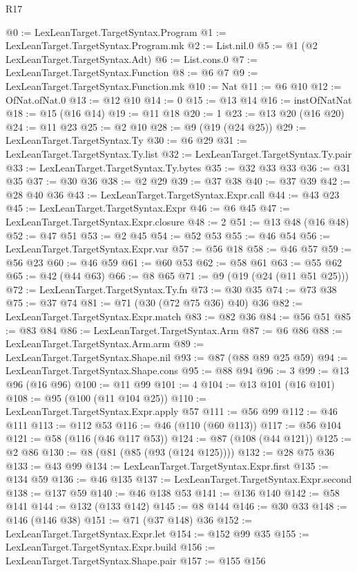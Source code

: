 \begin{lexlean}{R17}
\begin{coremodule}
@0 := LexLeanTarget.TargetSyntax.Program
@1 := LexLeanTarget.TargetSyntax.Program.mk
@2 := List.nil.{0}
@5 := @1 (@2 LexLeanTarget.TargetSyntax.Adt)
@6 := List.cons.{0}
@7 := LexLeanTarget.TargetSyntax.Function
@8 := @6 @7
@9 := LexLeanTarget.TargetSyntax.Function.mk
@10 := Nat
@11 := @6 @10
@12 := OfNat.ofNat.{0}
@13 := @12 @10
@14 := 0
@15 := @13 @14
@16 := instOfNatNat
@18 := @15 (@16 @14)
@19 := @11 @18
@20 := 1
@23 := @13 @20 (@16 @20)
@24 := @11 @23
@25 := @2 @10
@28 := @9 (@19 (@24 @25))
@29 := LexLeanTarget.TargetSyntax.Ty
@30 := @6 @29
@31 := LexLeanTarget.TargetSyntax.Ty.list
@32 := LexLeanTarget.TargetSyntax.Ty.pair
@33 := LexLeanTarget.TargetSyntax.Ty.bytes
@35 := @32 @33 @33
@36 := @31 @35
@37 := @30 @36
@38 := @2 @29
@39 := @37 @38
@40 := @37 @39
@42 := @28 @40 @36
@43 := LexLeanTarget.TargetSyntax.Expr.call
@44 := @43 @23
@45 := LexLeanTarget.TargetSyntax.Expr
@46 := @6 @45
@47 := LexLeanTarget.TargetSyntax.Expr.closure
@48 := 2
@51 := @13 @48 (@16 @48)
@52 := @47 @51
@53 := @2 @45
@54 := @52 @53
@55 := @46 @54
@56 := LexLeanTarget.TargetSyntax.Expr.var
@57 := @56 @18
@58 := @46 @57
@59 := @56 @23
@60 := @46 @59
@61 := @60 @53
@62 := @58 @61
@63 := @55 @62
@65 := @42 (@44 @63)
@66 := @8 @65
@71 := @9 (@19 (@24 (@11 @51 @25)))
@72 := LexLeanTarget.TargetSyntax.Ty.fn
@73 := @30 @35
@74 := @73 @38
@75 := @37 @74
@81 := @71 (@30 (@72 @75 @36) @40) @36
@82 := LexLeanTarget.TargetSyntax.Expr.match
@83 := @82 @36
@84 := @56 @51
@85 := @83 @84
@86 := LexLeanTarget.TargetSyntax.Arm
@87 := @6 @86
@88 := LexLeanTarget.TargetSyntax.Arm.arm
@89 := LexLeanTarget.TargetSyntax.Shape.nil
@93 := @87 (@88 @89 @25 @59)
@94 := LexLeanTarget.TargetSyntax.Shape.cons
@95 := @88 @94
@96 := 3
@99 := @13 @96 (@16 @96)
@100 := @11 @99
@101 := 4
@104 := @13 @101 (@16 @101)
@108 := @95 (@100 (@11 @104 @25))
@110 := LexLeanTarget.TargetSyntax.Expr.apply @57
@111 := @56 @99
@112 := @46 @111
@113 := @112 @53
@116 := @46 (@110 (@60 @113))
@117 := @56 @104
@121 := @58 (@116 (@46 @117 @53))
@124 := @87 (@108 (@44 @121))
@125 := @2 @86
@130 := @8 (@81 (@85 (@93 (@124 @125))))
@132 := @28 @75 @36
@133 := @43 @99
@134 := LexLeanTarget.TargetSyntax.Expr.first
@135 := @134 @59
@136 := @46 @135
@137 := LexLeanTarget.TargetSyntax.Expr.second
@138 := @137 @59
@140 := @46 @138 @53
@141 := @136 @140
@142 := @58 @141
@144 := @132 (@133 @142)
@145 := @8 @144
@146 := @30 @33
@148 := @146 (@146 @38)
@151 := @71 (@37 @148) @36
@152 := LexLeanTarget.TargetSyntax.Expr.let
@154 := @152 @99 @35
@155 := LexLeanTarget.TargetSyntax.Expr.build
@156 := LexLeanTarget.TargetSyntax.Shape.pair
@157 := @155 @156

\end{coremodule}
\end{lexlean}
